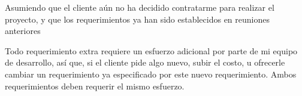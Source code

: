 Asumiendo que el cliente aún no ha decidido contratarme para realizar el proyecto, y que los requerimientos ya han sido establecidos en reuniones anteriores

Todo requerimiento extra requiere un esfuerzo adicional por parte de mi equipo de desarrollo, así que, si el cliente pide algo nuevo, subir el costo, u ofrecerle cambiar un requerimiento ya especificado por este nuevo requerimiento. Ambos requerimientos deben requerir el mismo esfuerzo.
